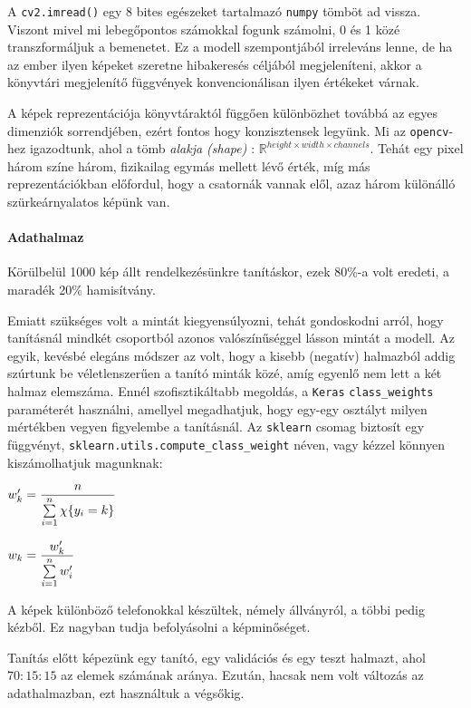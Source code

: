 A \texttt{cv2.imread()} egy 8 bites egészeket
tartalmazó \texttt{numpy} tömböt ad vissza. Viszont mivel mi lebegőpontos számokkal fogunk számolni,
0 és 1 közé transzformáljuk a bemenetet. Ez a modell szempontjából irreleváns lenne,
de ha az ember ilyen képeket szeretne hibakeresés céljából megjeleníteni, akkor a
könyvtári megjelenítő függvények konvencionálisan ilyen értékeket várnak.


A képek reprezentációja könyvtáraktól függően különbözhet továbbá az egyes dimenziók 
sorrendjében, ezért fontos hogy konzisztensek legyünk. Mi az \texttt{opencv}-hez
igazodtunk, ahol a tömb \textit{alakja (shape)} : 
$ \mathbb{R}^{height \times width \times channels } $. 
Tehát egy pixel három színe három, fizikailag egymás mellett lévő érték,
míg más reprezentációkban előfordul, hogy a csatornák vannak elől, azaz három különálló
szürkeárnyalatos képünk van.


\paragraph{Adathalmaz}

Körülbelül 1000 kép állt rendelkezésünkre tanításkor, ezek 80\%-a volt
eredeti, a maradék 20\% hamisítvány. 


Emiatt szükséges volt a mintát kiegyensúlyozni, tehát gondoskodni arról,
hogy tanításnál mindkét csoportból azonos valószínűséggel lásson mintát 
a modell. Az egyik, kevésbé elegáns módszer az volt, hogy a kisebb (negatív) 
halmazból addig szúrtunk be véletlenszerűen a tanító minták közé, 
amíg egyenlő nem lett a két halmaz elemszáma.
Ennél szofisztikáltabb megoldás, a \texttt{Keras} \texttt{class\_weights} paraméterét
használni, amellyel megadhatjuk, hogy egy-egy osztályt milyen mértékben vegyen 
figyelembe a tanításnál. Az \texttt{sklearn} csomag biztosít egy függvényt,
\texttt{sklearn.utils.compute\_class\_weight} néven, vagy kézzel könnyen kiszámolhatjuk 
magunknak:

$ w_k' =  \dfrac{n}{ \sum\limits_{{i}=1}^{n} \chi\{y_i = k\}}  $

$ w_k =  \dfrac{w_k'}{\sum\limits_{{i}=1}^{n} w_i'} $


A képek különböző telefonokkal készültek, némely állványról, a többi pedig kézből.
Ez nagyban tudja befolyásolni a képminőséget.


Tanítás előtt képezünk egy tanító, egy validációs és egy teszt halmazt, ahol 
$ 70:15:15 $ az elemek számának aránya. Ezután, hacsak nem volt változás az adathalmazban,
ezt használtuk a végsőkig.



